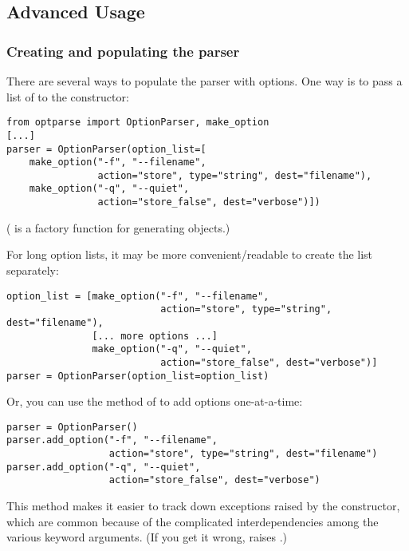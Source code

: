 \subsection{Advanced Usage\label{optparse-advanced-usage}}

\subsubsection{Creating and populating the
               parser\label{optparse-creating-the-parser}}

There are several ways to populate the parser with options.  One way
is to pass a list of  to the 
constructor:

\begin{verbatim}
from optparse import OptionParser, make_option
[...]
parser = OptionParser(option_list=[
    make_option("-f", "--filename",
                action="store", type="string", dest="filename"),
    make_option("-q", "--quiet",
                action="store_false", dest="verbose")])
\end{verbatim}

( is a factory function for generating
 objects.)

For long option lists, it may be more convenient/readable to create the
list separately:

\begin{verbatim}
option_list = [make_option("-f", "--filename",
                           action="store", type="string", dest="filename"),
               [... more options ...]
               make_option("-q", "--quiet",
                           action="store_false", dest="verbose")]
parser = OptionParser(option_list=option_list)
\end{verbatim}

Or, you can use the  method of
 to add options one-at-a-time:

\begin{verbatim}
parser = OptionParser()
parser.add_option("-f", "--filename",
                  action="store", type="string", dest="filename")
parser.add_option("-q", "--quiet",
                  action="store_false", dest="verbose")
\end{verbatim}

This method makes it easier to track down exceptions raised by the
 constructor, which are common because of the complicated
interdependencies among the various keyword arguments.  (If you get it
wrong,  raises .)

